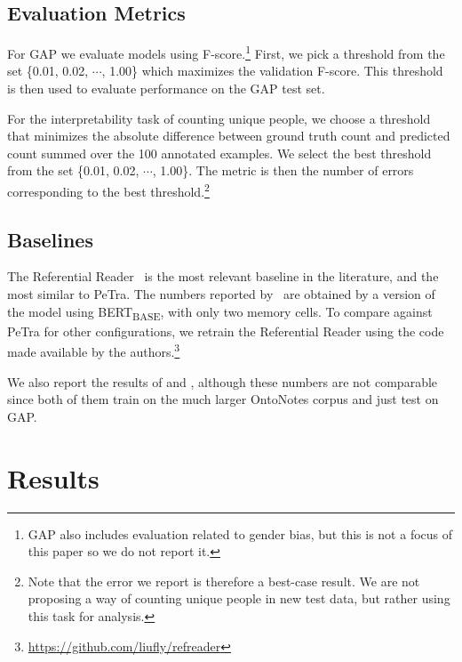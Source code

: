 \documentclass[11pt,a4paper]{article}
\newcommand{\bertbase}{BERT\textsubscript{BASE}\xspace}
\newcommand{\modelname}{PeTra\xspace}
\begin{document}
\subsection{Evaluation Metrics}
For GAP we evaluate models using F-score.\footnote{GAP also includes evaluation related to gender bias, but this is not a focus of this paper so we do not report it.}
First, we pick a threshold from the set \{0.01, 0.02, $\cdots$, 1.00\} which maximizes the validation F-score.
This threshold is then used to evaluate performance on the GAP test set.





For the interpretability task of counting unique people, we
choose a threshold that minimizes the absolute difference between ground truth count and predicted count summed over the 100 annotated examples.
We select the best threshold from the set \{0.01, 0.02, $\cdots$, 1.00\}.
The metric is then the number of errors corresponding to the best threshold.\footnote{Note that the error we report is therefore a best-case result.  We are not proposing a way of counting unique people in new test data, but rather using this task for analysis.}

\subsection{Baselines}
The Referential Reader~\cite{liu2019referential} is the most relevant baseline in the literature, and the most similar to \modelname.
The numbers reported by~\citet{liu2019referential} are obtained by a version of the model using \bertbase, with only two memory cells.
To compare against \modelname for other configurations, we retrain the Referential Reader using the code made available by the authors.\footnote{\url{https://github.com/liufly/refreader}}

We also report the results of \citet{joshi-etal-2019-bert} and \citet{wu2019coreference}, although these numbers are not comparable since both of them train on the much larger OntoNotes corpus and just test on GAP.
 \section{Results}
\end{document}
